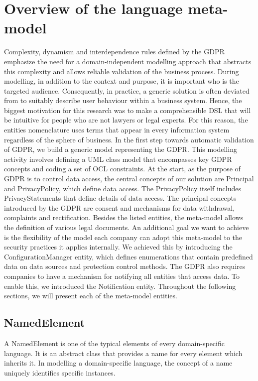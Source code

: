 \documentclass[11pt,english]{article}
\begin{document}
\section{Overview of the language meta-model}
Complexity, dynamism and interdependence rules defined by the GDPR emphasize the need for a domain-independent modelling approach that abstracts this complexity and allows reliable validation of the business process. During modelling, in addition to the context and purpose, it is important who is the targeted audience. Consequently, in practice, a generic solution is often deviated from to suitably describe user behaviour within a business system. Hence, the biggest motivation for this research was to make a comprehensible DSL that will be intuitive for people who are not lawyers or legal experts. For this reason, the entities nomenclature uses terms that appear in every information system regardless of the sphere of business. In the first step towards automatic validation of GDPR, we build a generic model representing the GDPR. This modelling activity involves defining a UML class model that encompasses key GDPR concepts and coding a set of OCL constraints. At the start, as the purpose of GDPR is to control data access, the central concepts of our solution are Principal and PrivacyPolicy, which define data access. The PrivacyPolicy itself includes PrivacyStatements that define details of data access. The principal concepts introduced by the GDPR are consent and mechanisms for data withdrawal, complaints and rectification. Besides the listed entities, the meta-model allows the definition of various legal documents. An additional goal we want to achieve is the flexibility of the model each company can adopt this meta-model to the security practices it applies internally. We achieved this by introducing the ConfigurationManager entity, which defines enumerations that contain predefined data on data sources and protection control methods. The GDPR also requires companies to have a mechanism for notifying all entities that access data. To enable this, we introduced the Notification entity. Throughout the following sections, we will present each of the meta-model entities.
\subsection{NamedElement}
A NamedElement is one of the typical elements of every domain-specific language. It is an abstract class that provides a name for every element which inherits it. In modelling a domain-specific language, the concept of a name uniquely identifies specific instances.
\end{document}
